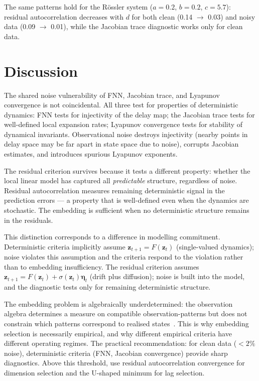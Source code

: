 The same patterns hold for the R\"{o}ssler system ($a = 0.2$, $b =
0.2$, $c = 5.7$): residual autocorrelation decreases with $d$ for
both clean (0.14 $\to$ 0.03) and noisy data (0.09 $\to$ 0.01),
while the Jacobian trace diagnostic works only for clean data.

\section{Discussion}
\label{sec:discussion}

The shared noise vulnerability of FNN, Jacobian trace, and
Lyapunov convergence is not coincidental.  All three test for
properties of deterministic dynamics: FNN tests for injectivity of
the delay map; the Jacobian trace tests for well-defined local
expansion rates; Lyapunov convergence tests for stability of
dynamical invariants.  Observational noise destroys injectivity
(nearby points in delay space may be far apart in state space due
to noise), corrupts Jacobian estimates, and introduces spurious
Lyapunov exponents.

The residual criterion survives because it tests a different
property: whether the local linear model has captured all
\emph{predictable} structure, regardless of noise.  Residual
autocorrelation measures remaining deterministic signal in the
prediction errors --- a property that is well-defined even when
the dynamics are stochastic.  The embedding is sufficient when no
deterministic structure remains in the residuals.

This distinction corresponds to a difference in modelling
commitment.  Deterministic criteria implicitly assume $\mathbf{z}_{t+1}
= F(\mathbf{z}_t)$ (single-valued dynamics); noise violates this
assumption and the criteria respond to the violation rather than
to embedding insufficiency.  The residual criterion assumes
$\mathbf{z}_{t+1} = F(\mathbf{z}_t) + \sigma(\mathbf{z}_t)
\boldsymbol{\eta}_t$ (drift plus diffusion); noise is built into
the model, and the diagnostic tests only for remaining
deterministic structure.

The embedding problem is algebraically underdetermined: the
observation algebra determines a measure on compatible
observation-patterns but does not constrain which patterns
correspond to realised states~\cite{mahon2026}.  This is why
embedding selection is necessarily empirical, and why different
empirical criteria have different operating regimes.  The practical
recommendation: for clean data ($< 2\%$ noise), deterministic
criteria (FNN, Jacobian convergence) provide sharp diagnostics.
Above this threshold, use residual autocorrelation convergence for
dimension selection and the U-shaped minimum for lag selection.

